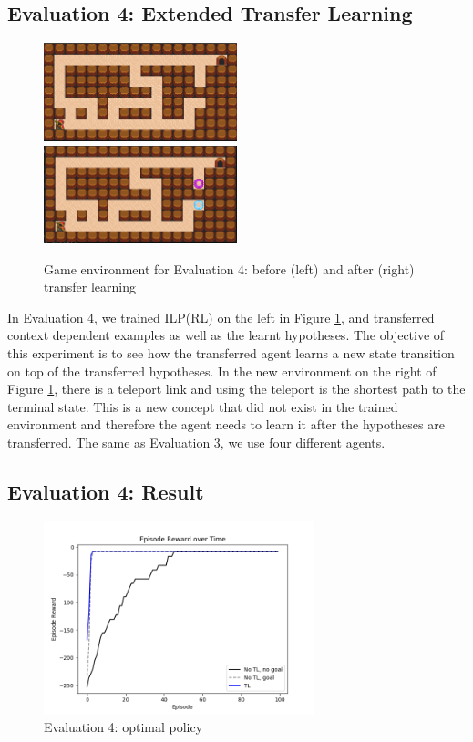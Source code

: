 \subsection{Evaluation 4: Extended Transfer Learning}
\label{subsec:experiement4_setup}
\begin{figure}[!htb]
\centerline{
\includegraphics[width=0.5\textwidth]{./figures/experiment4_before}
\includegraphics[width=0.5\textwidth]{./figures/experiment4_after}
}

\caption{Game environment for Evaluation 4: before (left) and after (right) transfer learning}
\label{experiment4_setup}
\end{figure}
In Evaluation 4, we trained ILP(RL) on the left in Figure \ref{experiment4_setup}, and transferred context dependent examples as well as the learnt hypotheses. The objective of this experiment is to see how the transferred agent learns a new state transition on top of the transferred hypotheses. In the new environment on the right of Figure \ref{experiment4_setup}, there is a teleport link and using the teleport is the shortest path to the terminal state. 
This is a new concept that did not exist in the trained environment and therefore the agent needs to learn it after the hypotheses are transferred.
The same as Evaluation 3, we use four different agents.

\subsection{Evaluation 4: Result}
\label{subsec:experiment_result_4}

\begin{figure}[!htb]
\centering
\includegraphics[width=0.7\textwidth]{./figures/experiment4_test}
\caption{Evaluation 4: optimal policy}
\label{experiment4_training_test}
\end{figure}

